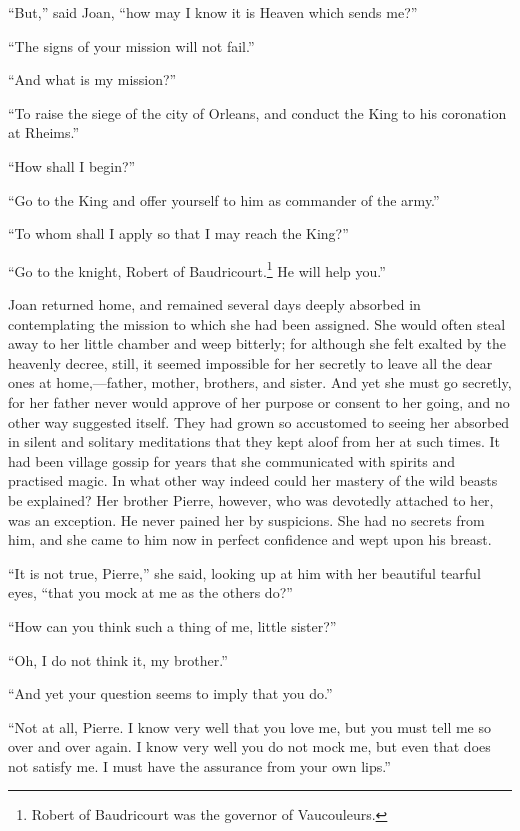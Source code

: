 ``But,'' said Joan, ``how may I know it is Heaven which sends me?''

``The signs of your mission will not fail.''

``And what is my mission?''

``To raise the siege of the city of Orleans, and conduct the King to his
coronation at Rheims.''

``How shall I begin?''

``Go to the King and offer yourself to him as commander of the army.''

``To whom shall I apply so that I may reach the King?''

``Go to the knight, Robert of Baudricourt.\footnote{Robert of
  Baudricourt was the governor of Vaucouleurs.} He will help you.''

Joan returned home, and remained several days deeply absorbed in
contemplating the mission to which she had been assigned. She would
often steal away to her little chamber and weep bitterly; for although
she felt exalted by the heavenly decree, still, it seemed impossible for
her secretly to leave all the dear ones at home,---father, mother,
brothers, and sister. And yet she must go secretly, for her father never
would approve of her purpose or consent to her going, and no other way
suggested itself. They had grown so accustomed to seeing her absorbed in
silent and solitary meditations that they kept aloof from her at such
times. It had been village gossip for years that she communicated with
spirits and practised magic. In what other way indeed could her mastery
of the wild beasts be explained? Her brother Pierre, however, who was
devotedly attached to her, was an exception. He never pained her by
suspicions. She had no secrets from him, and she came to him now in
perfect confidence and wept upon his breast.

``It is not true, Pierre,'' she said, looking up at him with her
beautiful tearful eyes, ``that you mock at me as the others do?''

``How can you think such a thing of me, little sister?''

``Oh, I do not think it, my brother.''

``And yet your question seems to imply that you do.''

``Not at all, Pierre. I know very well that you love me, but you must
tell me so over and over again. I know very well you do not mock me, but
even that does not satisfy me. I must have the assurance from your own
lips.''

